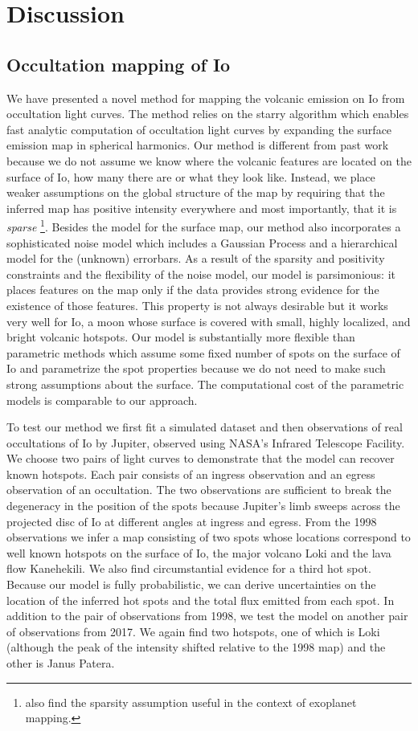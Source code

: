 \documentclass[modern]{aastex62}
\begin{document}
\section{Discussion}
\label{sec:discussion}
\subsection{Occultation mapping of Io}
We have presented a novel method for mapping the volcanic emission on Io from occultation light curves.
The method relies on the \textsf{starry} algorithm which enables fast analytic computation of occultation light curves by expanding the surface emission map in spherical harmonics.
Our method is different from past work because we do not assume we know where the volcanic features are located on the surface of Io, how many there are or what they look like.
Instead, we place weaker assumptions on the global structure of the map by requiring that the inferred map has positive intensity everywhere and most importantly, that it is \emph{sparse} \footnote{\cite{aizawa2020} also find the sparsity assumption useful in the context of exoplanet mapping.}.
Besides the model for the surface map, our method also incorporates a sophisticated noise model which includes a Gaussian Process and a hierarchical model for the (unknown) errorbars.
As a result of the sparsity and positivity constraints and the flexibility of the noise model,
our model is parsimonious: it places features on the map only if the data provides strong evidence for the existence of those features.
This property is not always desirable but it works very well for Io, a moon whose surface is covered with small, highly localized, and bright volcanic hotspots.
Our model is substantially more flexible than parametric methods which assume some fixed number of spots on the surface of Io and parametrize the spot properties because we do not need to make such strong assumptions about the surface.
The computational cost of the parametric models is comparable to our approach.

To test our method we first fit a simulated dataset and then observations of real occultations of Io by Jupiter, observed using NASA's Infrared Telescope Facility.
We choose two pairs of light curves to demonstrate that the model can recover known hotspots.
Each pair consists of an ingress observation and an egress observation of an occultation. 
The two observations are sufficient to break the degeneracy in the position of the spots because Jupiter's limb sweeps across the projected disc of Io at different angles at ingress and egress.
From the 1998 observations we infer a map consisting of two spots whose locations correspond to well known hotspots on the surface of Io, the major volcano Loki and the lava flow Kanehekili.
We also find circumstantial evidence for a third hot spot.
Because our model is fully probabilistic, we can derive uncertainties on the location of the inferred hot spots and the total flux emitted from each spot.
In addition to the pair of observations from 1998, we test the model on another pair of observations from 2017.
We again find two hotspots, one of which is Loki (although the peak of the intensity shifted relative to the 1998 map) and the other is Janus Patera.
\end{document}
